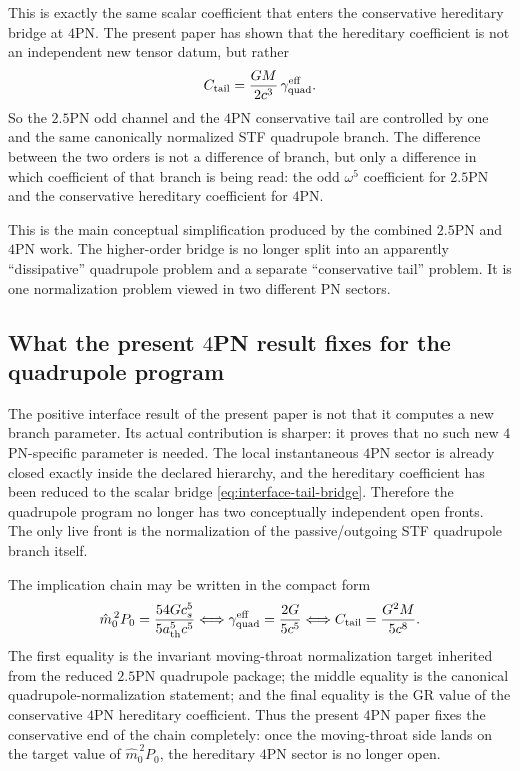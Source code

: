 \documentclass[11pt]{article}
\begin{document}
This is exactly the same scalar coefficient that enters the conservative
hereditary bridge at $4$PN.  The present paper has shown that the hereditary
coefficient is not an independent new tensor datum, but rather
\begin{equation}
C_{\rm tail}
=
\frac{GM}{2c^3}\,\gamma_{\rm quad}^{\rm eff}.
\label{eq:interface-tail-bridge}
\end{equation}
So the $2.5$PN odd channel and the $4$PN conservative tail are controlled by
one and the same canonically normalized STF quadrupole branch.  The difference
between the two orders is not a difference of branch, but only a difference in
which coefficient of that branch is being read: the odd $\omega^5$ coefficient
for $2.5$PN and the conservative hereditary coefficient for $4$PN.

This is the main conceptual simplification produced by the combined $2.5$PN and
$4$PN work.  The higher-order bridge is no longer split into an apparently
``dissipative'' quadrupole problem and a separate ``conservative tail''
problem.  It is one normalization problem viewed in two different PN sectors.

\subsection{What the present \texorpdfstring{$4$}{4}PN result fixes for the quadrupole program}
\label{sec:interface-what-4pn-fixes}

The positive interface result of the present paper is not that it computes a new
branch parameter.  Its actual contribution is sharper: it proves that no such
new $4$PN-specific parameter is needed.  The local instantaneous $4$PN sector is
already closed exactly inside the declared hierarchy, and the hereditary
coefficient has been reduced to the scalar bridge
\eqref{eq:interface-tail-bridge}.  Therefore the quadrupole program no longer
has two conceptually independent open fronts.  The only live front is the
normalization of the passive/outgoing STF quadrupole branch itself.

The implication chain may be written in the compact form
\begin{equation}
\hat m_0^{\,2}P_0
=
\frac{54Gc_s^5}{5a_{\rm th}^5c^5}
\Longleftrightarrow
\gamma_{\rm quad}^{\rm eff}=\frac{2G}{5c^5}
\Longleftrightarrow
C_{\rm tail}=\frac{G^2M}{5c^8}.
\label{eq:interface-implication-chain}
\end{equation}
The first equality is the invariant moving-throat normalization target inherited
from the reduced $2.5$PN quadrupole package; the middle equality is the
canonical quadrupole-normalization statement; and the final equality is the GR
value of the conservative $4$PN hereditary coefficient.  Thus the present $4$PN
paper fixes the conservative end of the chain completely: once the moving-throat
side lands on the target value of $\hat m_0^{\,2}P_0$, the hereditary $4$PN
sector is no longer open.
\end{document}
